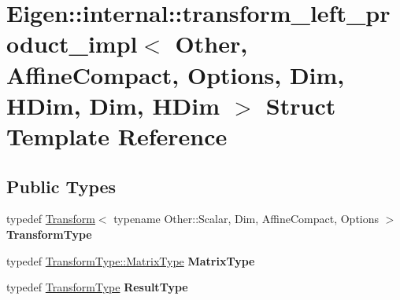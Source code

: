 \hypertarget{struct_eigen_1_1internal_1_1transform__left__product__impl_3_01_other_00_01_affine_compact_00_015e9b9427c7ea1ff34d05c5964520dbab}{}\section{Eigen\+::internal\+::transform\+\_\+left\+\_\+product\+\_\+impl$<$ Other, Affine\+Compact, Options, Dim, H\+Dim, Dim, H\+Dim $>$ Struct Template Reference}
\label{struct_eigen_1_1internal_1_1transform__left__product__impl_3_01_other_00_01_affine_compact_00_015e9b9427c7ea1ff34d05c5964520dbab}
\subsection*{Public Types}
\begin{DoxyCompactItemize}
\item 
\mbox{\label{struct_eigen_1_1internal_1_1transform__left__product__impl_3_01_other_00_01_affine_compact_00_015e9b9427c7ea1ff34d05c5964520dbab_afe47c78d4b5a22005487a833d1d3c78d}} 
typedef \mbox{\hyperlink{class_eigen_1_1_transform}{Transform}}$<$ typename Other\+::\+Scalar, Dim, Affine\+Compact, Options $>$ {\bfseries Transform\+Type}
\item 
\mbox{\label{struct_eigen_1_1internal_1_1transform__left__product__impl_3_01_other_00_01_affine_compact_00_015e9b9427c7ea1ff34d05c5964520dbab_abbc6c01fc0e4b94fe4270e96b7efa014}} 
typedef \mbox{\hyperlink{class_eigen_1_1_transform_a30f72ba46abc2bb3c7fa919c1078fc9c}{Transform\+Type\+::\+Matrix\+Type}} {\bfseries Matrix\+Type}
\item 
\mbox{\label{struct_eigen_1_1internal_1_1transform__left__product__impl_3_01_other_00_01_affine_compact_00_015e9b9427c7ea1ff34d05c5964520dbab_aa0bb2934bbc75a355d1123444798de0e}} 
typedef \mbox{\hyperlink{class_eigen_1_1_transform}{Transform\+Type}} {\bfseries Result\+Type}
\end{DoxyCompactItemize}
